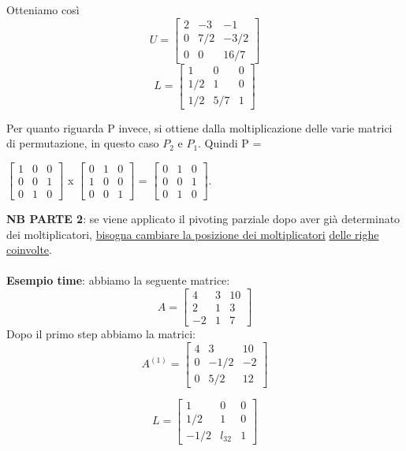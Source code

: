 Otteniamo così 
$$ U =
\begin{bmatrix}
2 & -3 & -1 \\
0 & 7/2 & -3/2 \\
0 & 0 & 16/7 
\end{bmatrix}
$$
$$ L =
\begin{bmatrix}
1 & 0 & 0 \\
1/2 & 1 & 0 \\
1/2 & 5/7 & 1 
\end{bmatrix}
$$

Per quanto riguarda P invece, si ottiene dalla moltiplicazione delle varie matrici di permutazione, in questo caso $P_2$ e $P_1$. Quindi P = \\
\begin{center}
$
\begin{bmatrix}
1 & 0 & 0 \\
0 & 0 & 1 \\
0 & 1 & 0 
\end{bmatrix}
$
x
$
\begin{bmatrix}
0 & 1 & 0 \\
1 & 0 & 0 \\
0 & 0 & 1 
\end{bmatrix}
$
=
$
\begin{bmatrix}
0 & 1 & 0 \\
0 & 0 & 1 \\
0 & 1 & 0 
\end{bmatrix}
$.
\end{center}

\textbf{NB PARTE 2}: se viene applicato il pivoting parziale dopo aver già determinato dei moltiplicatori, \underline{bisogna cambiare la posizione dei moltiplicatori} \underline{delle righe coinvolte}.\\\\
\textbf{Esempio time}: abbiamo la seguente matrice:
$$ A =
\begin{bmatrix}
4 & 3 & 10 \\
2 & 1 & 3 \\
-2 & 1 & 7
\end{bmatrix}
$$
\noindent
Dopo il primo step abbiamo la matrici:\\

$$ A^{(1)} =
\begin{bmatrix}
4 & 3 & 10 \\
0 & -1/2 & -2 \\
0 & 5/2 & 12 
\end{bmatrix}
$$
\noindent

$$ L =
\begin{bmatrix}
1 & 0 & 0 \\
1/2 & 1 & 0 \\
- 1/2 & l_{32} & 1 
\end{bmatrix}
$$

